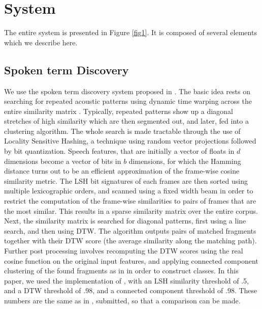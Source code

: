 \documentclass[a4paper]{article}
\begin{document}
\section{System}
The entire system is presented in Figure \ref{fig1}. It is composed of several elements which we describe here.
\subsection{Spoken term Discovery}
We use the spoken term discovery system proposed in \cite{jansen&vandurme2011}. The basic idea rests on searching for repeated acoustic patterns using dynamic time warping across the entire similarity matrix \cite{park&glass2008}. Typically, repeated patterns show up a diagonal stretches of high similarity which are then segmented out, and later, fed into a clustering algorithm. The whole search is made tractable through the use of Locality Sensitive Hashing, a technique using random vector projections followed by bit quantization. Speech features, that are initially a vector of floats in $d$ dimensions become a vector of bits in $b$ dimensions, for which the Hamming distance turns out to be an efficient approximation of the frame-wise cosine similarity metric. The LSH bit signatures of each frames are then sorted using multiple lexicographic orders, and scanned using a fixed width beam in order to restrict the computation of the frame-wise similarities to pairs of frames that are the most similar. This results in a sparse similarity matrix over the entire corpus. Next, the similarity matrix is searched for diagonal patterns, first using a line search, and then using DTW.  The algorithm outputs pairs of matched fragments together with their DTW score (the average similarity along the matching path). Further post processing involves recomputing the DTW scores using the real cosine function on the original input features, and applying connected component clustering of the found fragments as in \cite{park&glass2008} in order to construct classes. In this paper, we used the implementation of \cite{jansen&vandurme2011}, with an LSH similarity threshold of .5, and a DTW  threshold of .98, and a connected component threshold of .98. These numbers are the same as in \cite{}, submitted, so that a comparison can be made.
\end{document}
